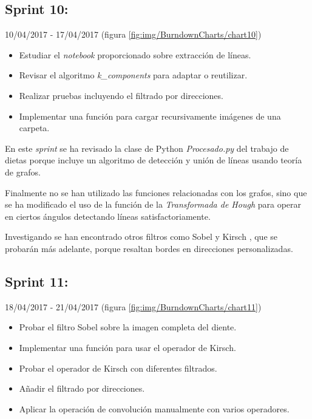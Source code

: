 \newpage

\subsection{Sprint 10:}
10/04/2017 - 17/04/2017 (figura \ref{fig:img/BurndownCharts/chart10})
\begin{itemize}
    \item Estudiar el \textit{notebook} proporcionado sobre extracción de líneas.
    \item Revisar el algoritmo \textit{k\_components}  para adaptar o reutilizar.
    \item Realizar pruebas incluyendo el filtrado por direcciones.
    \item Implementar una función para cargar recursivamente imágenes de una carpeta.
\end{itemize}

En este \textit{sprint} se ha revisado la clase de Python \textit{Procesado.py} del trabajo de dietas \cite{dietasIsma} porque incluye un algoritmo de detección y unión de líneas usando teoría de grafos. 

Finalmente no se han utilizado las funciones relacionadas con los grafos, sino que se ha modificado el uso de la función de la \textit{Transformada de Hough} para operar en ciertos ángulos detectando líneas satisfactoriamente.

Investigando se han encontrado otros filtros como Sobel \cite{wiki:Sobel} y Kirsch \cite{scholar:venmathi2016kirsch}, que se probarán más adelante, porque resaltan bordes en direcciones personalizadas.

\newpage

\subsection{Sprint 11:}
18/04/2017 - 21/04/2017 (figura \ref{fig:img/BurndownCharts/chart11})
\begin{itemize}
    \item Probar el filtro Sobel sobre la imagen completa del diente.
    \item Implementar una función para usar el operador de Kirsch.
    \item Probar el operador de Kirsch con diferentes filtrados.
    \item Añadir el filtrado por direcciones.
    \item Aplicar la operación de convolución manualmente con varios operadores. 
\end{itemize}

